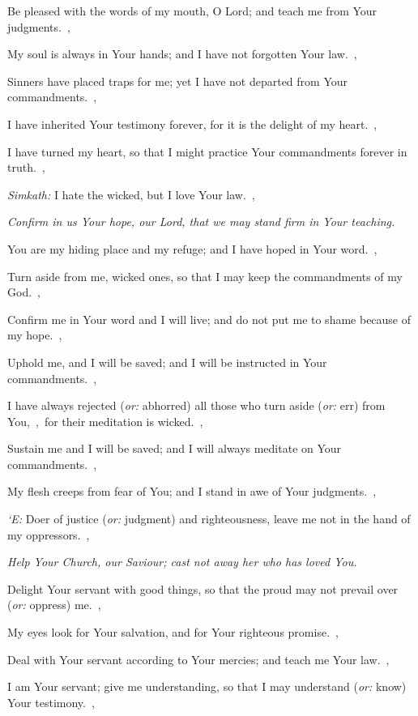 \documentclass[12pt,twoside,a5paper]{article}
\newcommand{\qanona}[1]{{\liturgicalhint{Qanona.} \emph{#1}}}
\newcommand{\translationoption}[1]{\emph{or:} #1}
\begin{document}
\begin{normalparskip}
  Be pleased with the words of my mouth, O Lord; and teach me from Your judgments.~\sep

  My soul is always in Your hands; and I have not forgotten Your law.~\sep

  Sinners have placed traps for me; yet I have not departed from Your commandments.~\sep

  I have inherited Your testimony forever, for it is the delight of my heart.~\sep

  I have turned my heart, so that I might practice Your commandments forever in truth.~\sep

  \emph{Simkath:} I hate the wicked, but I love Your law.~\sep

  \qanona{Confirm in us Your hope, our Lord, that we may stand firm in Your teaching.}

  You are my hiding place and my refuge; and I have hoped in Your word.~\sep

  Turn aside from me, wicked ones, so that I may keep the commandments of my God.~\sep

  Confirm me in Your word and I will live; and do not put me to shame because of my hope.~\sep

  Uphold me, and I will be saved; and I will be instructed in Your commandments.~\sep

  I have always rejected (\translationoption{abhorred}) all those who turn aside (\translationoption{err}) from You,~\sep\ for their meditation is wicked.~\sep

  Sustain me and I will be saved; and I will always meditate on Your commandments.~\sep

  My flesh creeps from fear of You; and I stand in awe of Your judgments.~\sep

  \emph{`E:} Doer of justice (\translationoption{judgment}) and righteousness, leave me not in the hand of my oppressors.~\sep

  \qanona{Help Your Church, our Saviour; cast not away her who has loved You.}

  Delight Your servant with good things, so that the proud may not prevail over (\translationoption{oppress}) me.~\sep

  My eyes look for Your salvation, and for Your righteous promise.~\sep

  Deal with Your servant according to Your mercies; and teach me Your law.~\sep

  I am Your servant; give me understanding, so that I may understand (\translationoption{know}) Your testimony.~\sep


\end{normalparskip}
\end{document}
